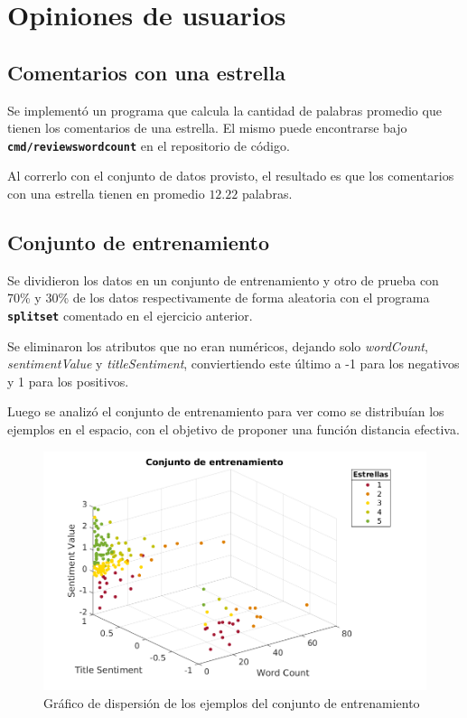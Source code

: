 \documentclass[a4paper]{article}
\newcommand{\bold}[1]{\textbf{\texttt{#1}}}
\begin{document}
\newpage

\section{Opiniones de usuarios}

\subsection{Comentarios con una estrella}
Se implementó un programa que calcula la cantidad de palabras promedio que tienen los comentarios de una estrella. El mismo puede encontrarse bajo \bold{cmd/reviewswordcount} en el repositorio de código.

Al correrlo con el conjunto de datos provisto, el resultado es que los comentarios con una estrella tienen en promedio $12.22$ palabras.

\subsection{Conjunto de entrenamiento}
Se dividieron los datos en un conjunto de entrenamiento y otro de prueba con 70\% y 30\% de los datos respectivamente de forma aleatoria con el programa \bold{splitset} comentado en el ejercicio anterior.

Se eliminaron los atributos que no eran numéricos, dejando solo \textit{wordCount}, \textit{sentimentValue} y \textit{titleSentiment}, conviertiendo este último a -1 para los negativos y 1 para los positivos.

Luego se analizó el conjunto de entrenamiento para ver como se distribuían los ejemplos en el espacio, con el objetivo de proponer una función distancia efectiva.

\begin{figure}[h]
  \centering
    \includegraphics[scale=0.5]{img/knn-training-set-scatter.png}
  \caption{Gráfico de dispersión de los ejemplos del conjunto de entrenamiento}
  \label{fig:ej3-scatter-training}
\end{figure}
\end{document}
